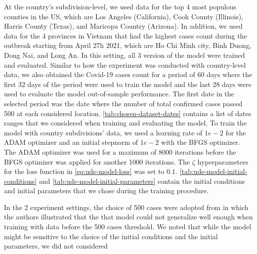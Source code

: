 At the country's subdivision-level, we used data for the top 4 most populous counties in the \gls{US}, which are Los Angeles (California), Cook County (Illinois), Harris County (Texas), and Maricopa Country (Arizona).
In addition, we used data for the 4 provinces in Vietnam that had the highest cases count during the outbreak starting from April 27h 2021, which are Ho Chi Minh city, Binh Duong, Dong Nai, and Long An.
In this setting, all 3 version of the model were trained and evaluated.
Similar to how the experiment was conducted with country-level data, we also obtained the Covid-19 cases count for a period of 60 days where the first 32 days of the period were used to train the model and the last 28 days were used to evaluate the model out-of-sample performance.
The first date in the selected period was the date where the number of total confirmed cases passed 500 at each considered location.
\autoref{tab:chosen-dataset-dates} contains a list of dates ranges that we considered when training and evaluating the model.
To train the model with country subdivisions' data, we used a learning rate of $1e-2$ for the ADAM optimizer and an initial stepnorm of $1e-2$ with the BFGS optimizer.
The ADAM optimizer was used for a maximum of 8000 iterations before the BFGS optimizer was applied for another 1000 iterations.
The $\zeta$ hyperparameters for the loss function in \autoref{eq:ude-model-loss} was set to $0.1$.
\autoref{tab:ude-model-initial-conditions} and \autoref{tab:ude-model-initial-parameters} contain the initial conditions and initial parameters that we chose during the training procedure.

In the 2 experiment settings, the choice of 500 cases were adopted from \cite{dandekarMachineLearningAidedGlobal2020a} in which the authors illustrated that the that model could not generalize well enough when training with data before the 500 cases threshold.
We noted that while the model might be sensitive to the choice of the initial conditions and the initial parameters, we did not considered

